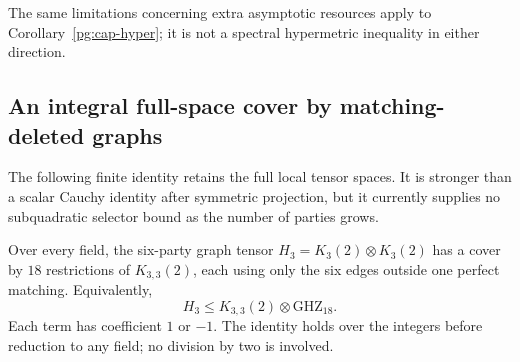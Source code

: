 The same limitations concerning extra asymptotic resources apply to
Corollary~\ref{pg:cap-hyper}; it is not a spectral hypermetric
inequality in either direction.

\subsection{An integral full-space cover by matching-deleted graphs}

The following finite identity retains the full local tensor spaces. It is
stronger than a scalar Cauchy identity after symmetric projection, but it
currently supplies no subquadratic selector bound as the number of parties
grows.

\begin{proposition}
\label{pg:cauchy-r3-integral}
Over every field, the six-party graph tensor
$H_3=K_3(2)\otimes K_3(2)$ has a cover by $18$ restrictions of
$K_{3,3}(2)$, each using only the six edges outside one perfect matching.
Equivalently,
\[
 H_3\leq K_{3,3}(2)\otimes\mathrm{GHZ}_{18}.
 \tag{PG-CAUCHY-18}
\]
Each term has coefficient $1$ or $-1$. The identity holds over the integers
before reduction to any field; no division by two is involved.
\end{proposition}
